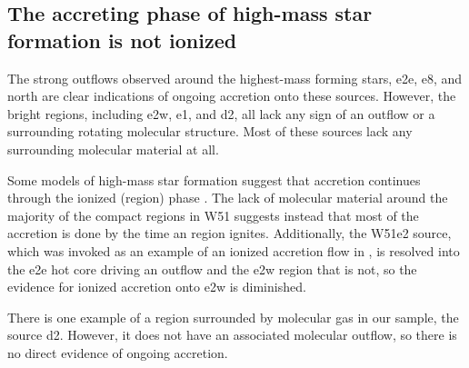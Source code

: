 \documentclass{emulateapj}
\begin{document}
\subsection{The accreting phase of high-mass star formation is not ionized}
\label{sec:accretionandoutflows}
The strong outflows observed around the highest-mass forming stars, e2e, e8,
and north are clear indications of ongoing accretion onto these sources.
However, the bright \hii regions, including e2w, e1, and d2, all lack any sign
of an outflow or a surrounding rotating molecular structure.  Most of these
sources lack any surrounding molecular material at all.

Some models of high-mass star formation suggest that accretion continues
through the ionized (\hii region) phase \citep{Keto2002b,Keto2003}.  The lack
of molecular material around the majority of the compact \hii regions in W51
suggests instead that most of the accretion is done by the time an \hii region
ignites.  Additionally, the W51e2 source, which was invoked as an example of an
ionized accretion flow in \citet{Keto2008a}, is  resolved into the e2e
hot core driving an outflow and the e2w \hchii region that is not, so the
evidence for ionized accretion onto e2w is diminished.

There is one example of a \hchii region surrounded by molecular gas in our
sample, the source d2.  However, it does not have an associated molecular
outflow, so there is no direct evidence of ongoing accretion.

% 
\end{document}
